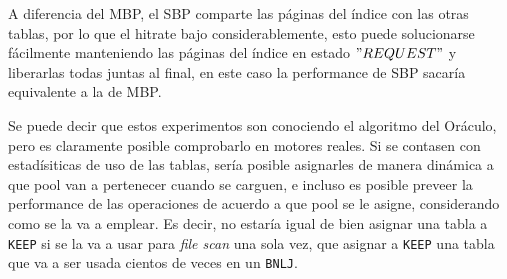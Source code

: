 A diferencia del MBP, el SBP comparte las páginas del índice con las otras tablas, por lo que el hitrate
bajo considerablemente, esto puede solucionarse fácilmente manteniendo las páginas del índice en estado
$"REQUEST"$ y liberarlas todas juntas al final, en este caso la performance de SBP sacaría equivalente a la de MBP.

Se puede decir que estos experimentos son conociendo el algoritmo del Or\'aculo,
pero es claramente posible comprobarlo en motores reales. Si se contasen
con estadísiticas de uso de las tablas, sería posible asignarles de manera
din\'amica a que pool van a pertenecer cuando se carguen, e incluso es
posible preveer la performance de las operaciones de acuerdo a que pool
se le asigne, considerando como se la va a emplear. Es decir, no estaría
igual de bien asignar una tabla a \texttt{KEEP} si se la va a usar para \textit{file scan}
una sola vez, que asignar a \texttt{KEEP} una tabla que va a ser usada cientos de veces
en un \texttt{BNLJ}.
